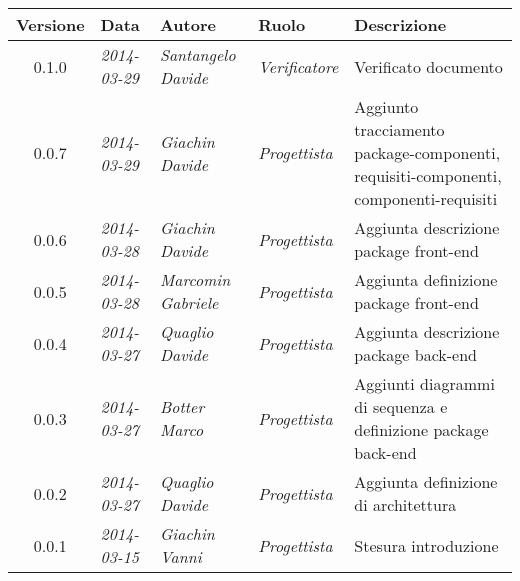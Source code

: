 \begin{small}
\begin{tabular}{|c|p{1.8cm}|p{2.8cm}|p{2.8cm}|p{3.5cm}|}
\hline
Versione & Data & Autore & Ruolo & Descrizione \\
\hline
0.1.0 & \textit{2014-03-29} & 
\textit{Santangelo Davide} &
\textit{Verificatore} &Verificato documento\\
\hline
0.0.7 & \textit{2014-03-29} & 
\textit{Giachin Davide} &
\textit{Progettista} & Aggiunto tracciamento package-componenti, requisiti-componenti, componenti-requisiti\\
\hline
0.0.6 & \textit{2014-03-28} & 
\textit{Giachin Davide} &
\textit{Progettista} & Aggiunta descrizione package front-end\\
\hline
0.0.5 & \textit{2014-03-28} & 
\textit{Marcomin Gabriele} &
\textit{Progettista} & Aggiunta definizione package front-end\\
\hline
0.0.4 & \textit{2014-03-27} & 
\textit{Quaglio Davide} &
\textit{Progettista} & Aggiunta descrizione package back-end\\
\hline
0.0.3 & \textit{2014-03-27} & 
\textit{Botter Marco} &
\textit{Progettista} & Aggiunti diagrammi di sequenza e definizione package back-end\\
\hline
0.0.2 & \textit{2014-03-27} & 
\textit{Quaglio Davide} &
\textit{Progettista} & Aggiunta definizione di architettura \\
\hline
0.0.1 & \textit{2014-03-15} & 
\textit{Giachin Vanni} &
\textit{Progettista} & Stesura introduzione\\
\hline
\end{tabular}\\
\end{small}